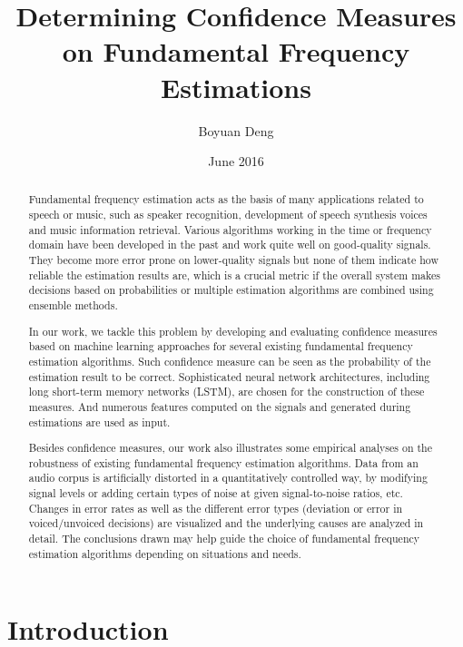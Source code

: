 \documentclass[11pt,a4paper]{report}
\title{Determining Confidence Measures on Fundamental Frequency Estimations}
\author{Boyuan Deng}
\date{June 2016}
\begin{document}
\maketitle



\begin{abstract}
Fundamental frequency estimation acts as the basis of many applications related to speech or music, such as speaker recognition, development of speech synthesis voices and music information retrieval.
Various algorithms working in the time or frequency domain have been developed in the past and work quite well on good-quality signals.
They become more error prone on lower-quality signals but none of them indicate how reliable the estimation results are, which is a crucial metric if the overall system makes decisions based on probabilities or multiple estimation algorithms are combined using ensemble methods.

In our work, we tackle this problem by developing and evaluating confidence measures based on machine learning approaches for several existing fundamental frequency estimation algorithms.
Such confidence measure can be seen as the probability of the estimation result to be correct.
Sophisticated neural network architectures, including long short-term memory networks (LSTM), are chosen for the construction of these measures.
And numerous features computed on the signals and generated during estimations are used as input.

Besides confidence measures, our work also illustrates some empirical analyses on the robustness of existing fundamental frequency estimation algorithms.
Data from an audio corpus is artificially distorted in a quantitatively controlled way, by modifying signal levels or adding certain types of noise at given signal-to-noise ratios, etc.
Changes in error rates as well as the different error types (deviation or error in voiced/unvoiced decisions) are visualized and the underlying causes are analyzed in detail.
The conclusions drawn may help guide the choice of fundamental frequency estimation algorithms depending on situations and needs.
\end{abstract}

\tableofcontents

\listoffigures
\listoftables

\chapter{Introduction}
\end{document}
